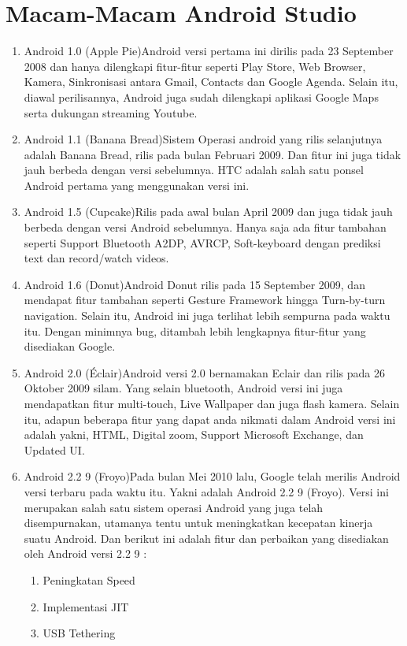 \section{Macam-Macam Android Studio }
\begin{enumerate}
\item Android 1.0 (Apple Pie)Android versi pertama ini dirilis pada 23 September 2008 dan hanya dilengkapi fitur-fitur seperti Play Store, Web Browser, Kamera, Sinkronisasi antara Gmail, Contacts dan Google Agenda. Selain itu, diawal perilisannya, Android juga sudah dilengkapi aplikasi Google Maps serta dukungan streaming Youtube.
\item Android 1.1 (Banana Bread)Sistem Operasi android yang rilis selanjutnya adalah Banana Bread, rilis pada bulan Februari 2009. Dan fitur ini juga tidak jauh berbeda dengan versi sebelumnya.
HTC adalah salah satu ponsel Android pertama yang menggunakan versi ini.
\item Android 1.5 (Cupcake)Rilis pada awal bulan April 2009 dan juga tidak jauh berbeda dengan versi Android sebelumnya. Hanya saja ada fitur tambahan seperti Support Bluetooth A2DP, AVRCP, Soft-keyboard dengan prediksi text dan record/watch videos.
\item Android 1.6 (Donut)Android Donut rilis pada 15 September 2009, dan mendapat fitur tambahan seperti Gesture Framework hingga Turn-by-turn navigation. Selain itu, Android ini juga terlihat lebih sempurna pada waktu itu. Dengan minimnya bug, ditambah lebih lengkapnya fitur-fitur yang disediakan Google.
\item Android 2.0 (Éclair)Android versi 2.0 bernamakan Eclair dan rilis pada 26 Oktober 2009 silam. Yang selain bluetooth, Android versi ini juga mendapatkan fitur multi-touch, Live Wallpaper dan juga flash kamera.
Selain itu, adapun beberapa fitur yang dapat anda nikmati dalam Android versi ini adalah yakni, HTML, Digital zoom, Support Microsoft Exchange, dan Updated UI.
\item Android 2.2 9 (Froyo)Pada bulan Mei 2010 lalu, Google telah merilis Android versi terbaru pada waktu itu. Yakni adalah Android 2.2 9 (Froyo). Versi ini merupakan salah satu sistem operasi Android yang juga telah disempurnakan, utamanya tentu untuk meningkatkan kecepatan kinerja suatu Android.
Dan berikut ini adalah fitur dan perbaikan yang disediakan oleh Android versi 2.2 9 :
\begin{enumerate}
\item Peningkatan Speed
\item Implementasi JIT
\item USB Tethering

\end{enumerate}
\end{enumerate}
